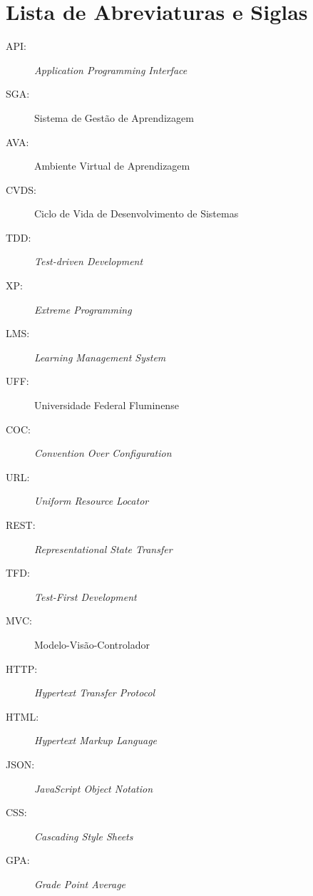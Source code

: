 
\chapter*{Lista de Abreviaturas e Siglas}

\thispagestyle{myheadings}

\begin{description}
    \item [API:] \textit{Application Programming Interface}
    \item [SGA:] Sistema de Gestão de Aprendizagem
    \item [AVA:] Ambiente Virtual de Aprendizagem
    \item [CVDS:] Ciclo de Vida de Desenvolvimento de Sistemas
    \item [TDD:] \textit{Test-driven Development}
    \item [XP:] \textit{Extreme Programming}
    \item [LMS:] \textit{Learning Management System}
    \item [UFF:] Universidade Federal Fluminense
    \item [COC:] \textit{Convention Over Configuration}
    \item [URL:] \textit{Uniform Resource Locator}
    \item [REST:] \textit{Representational State Transfer}
    \item [TFD:] \textit{Test-First Development}
    \item [MVC:] Modelo-Visão-Controlador
    \item [HTTP:] \textit{Hypertext Transfer Protocol}
    \item [HTML:] \textit{Hypertext Markup Language}
    \item [JSON:] \textit{JavaScript Object Notation}
    \item [CSS:] \textit{Cascading Style Sheets}
    \item [GPA:] \textit{Grade Point Average}
\end{description}

